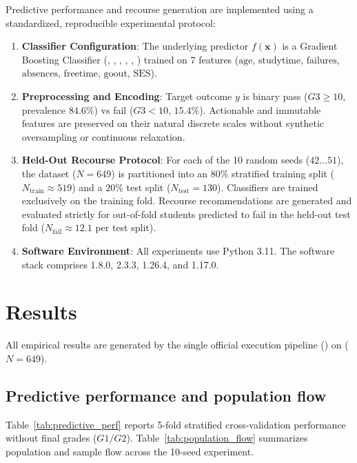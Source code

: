 \documentclass[11pt]{article}
\begin{document}
Predictive performance and recourse generation are implemented using a standardized, reproducible experimental protocol:
\begin{enumerate}
    \item \textbf{Classifier Configuration}: The underlying predictor $f(\mathbf{x})$ is a Gradient Boosting Classifier \cite{ChenGuestrin2016} (, , , , , ) trained on 7 features ($\text{age}$, $\text{studytime}$, $\text{failures}$, $\text{absences}$, $\text{freetime}$, $\text{goout}$, $\text{SES}$).
    \item \textbf{Preprocessing and Encoding}: Target outcome $y$ is binary pass ($G3 \ge 10$, prevalence $84.6\%$) vs fail ($G3 < 10$, $15.4\%$). Actionable and immutable features are preserved on their natural discrete scales without synthetic oversampling or continuous relaxation.
    \item \textbf{Held-Out Recourse Protocol}: For each of the 10 random seeds ($42 \dots 51$), the dataset ($N=649$) is partitioned into an $80\%$ stratified training split ($N_{\text{train}} \approx 519$) and a $20\%$ test split ($N_{\text{test}} = 130$). Classifiers are trained exclusively on the training fold. Recourse recommendations are generated and evaluated strictly for out-of-fold students predicted to fail in the held-out test fold ($N_{\text{fail}} \approx 12.1$ per test split).
    \item \textbf{Software Environment}: All experiments use Python 3.11. The software stack comprises  1.8.0,  2.3.3,  1.26.4, and  1.17.0.
\end{enumerate}

\section{Results}
\label{sec:results}

All empirical results are generated by the single official execution pipeline () on  ($N=649$).

\subsection{Predictive performance and population flow}

Table~\ref{tab:predictive_perf} reports 5-fold stratified cross-validation performance without final grades ($G1/G2$). Table~\ref{tab:population_flow} summarizes population and sample flow across the 10-seed experiment.
\end{document}

